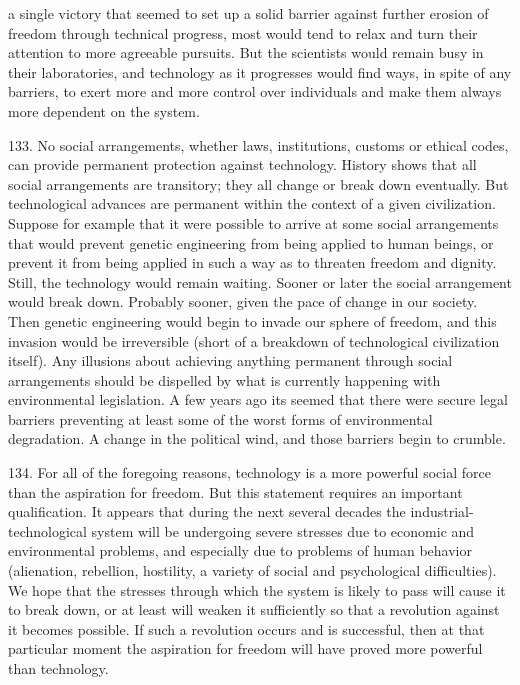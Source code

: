 \documentclass{article}
\begin{document}
a single victory that seemed to set up a solid barrier against further  erosion of freedom through 
technical progress, most would tend to relax and turn their attention to more agreeable 
pursuits.  But the scientists would remain busy in their laboratories, and technology as it progresses 
would  find  ways,  in  spite  of  any  barriers,  to  exert  more  and  more  control  over  individuals  and  
make them always more dependent on the system. \vspace{\baselineskip}

133.  No  social  arrangements,  whether  laws,  institutions,  customs  or  ethical  codes,  can  provide  
permanent protection against technology.  History shows that all social arrangements are 
transitory; they all change or break down eventually.  But technological advances are permanent 
within the context of a given civilization.  Suppose for example that it were possible to arrive at 
some  social  arrangements  that  would  prevent  genetic  engineering  from  being  applied  to  human  
beings, or prevent it from being applied in such a way as to threaten freedom and dignity.  Still, 
the  technology  would  remain  waiting.   Sooner  or  later  the  social  arrangement  would  break  
down.  Probably sooner, given the pace of change in our society.  Then genetic engineering would 
begin  to  invade  our  sphere  of  freedom,  and  this  invasion  would  be  irreversible  (short  of  a  
breakdown of technological civilization itself).  Any illusions about achieving anything permanent 
through social arrangements should be dispelled by what is currently happening with 
environmental  legislation.   A  few  years  ago  its  seemed  that  there  were  secure  legal  barriers  
preventing at least some of the worst forms of environmental degradation.  A change in the political 
wind, and those barriers begin to crumble. \vspace{\baselineskip} \newline

134.  For  all  of  the  foregoing  reasons,  technology  is  a  more  powerful  social  force  than  the  
aspiration  for  freedom.   But  this  statement  requires  an  important  qualification.   It  appears  that  
during  the  next  several  decades  the  industrial-technological  system  will  be  undergoing  severe  
stresses due to economic and environmental problems, and especially due to problems of human 
behavior  (alienation,  rebellion,  hostility,  a  variety  of  social  and  psychological  difficulties).   We 
hope that the stresses through which the system is likely to pass will cause it to break down, or at 
least  will  weaken  it  sufficiently  so  that  a  revolution  against  it  becomes  possible.   If  such  a  
revolution occurs and is successful, then at that particular moment the aspiration for freedom will 
have proved more powerful than technology. \vspace{\baselineskip}
\end{document}
